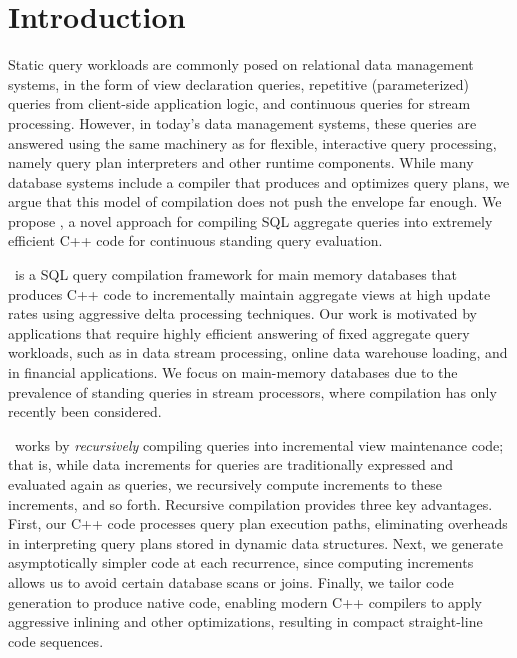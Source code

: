 \section{Introduction}
Static query workloads are commonly posed on relational data management systems,
in the form of view declaration queries, repetitive (parameterized) queries from
client-side application logic, and continuous queries for stream processing.
However, in today's data management systems, these queries are answered using the
same machinery as for flexible, interactive query processing, namely query plan
interpreters and other runtime components. While many database systems include a
compiler that produces and optimizes query plans, we argue that this model of
compilation does not push the envelope far enough. We propose \compiler, a novel
approach for compiling SQL aggregate queries into extremely efficient C++ code
for continuous standing query evaluation.

\compiler\ is a SQL query compilation framework for main memory databases that
produces C++ code to incrementally maintain aggregate views at high update rates
using aggressive delta processing techniques. Our work is motivated by
applications that require highly efficient answering of fixed aggregate query
workloads, such as in data stream processing, online data warehouse loading, and
in financial applications. We focus on main-memory databases due to the
prevalence of standing queries in stream processors, where compilation has
only recently been considered.

\compiler\ works by {\em recursively}\/ compiling queries into incremental view
maintenance code; that is, while data increments for queries are traditionally
expressed and evaluated again as queries, we recursively compute increments to
these increments, and so forth. Recursive compilation provides three key
advantages. First, our C++ code processes query plan execution paths, eliminating
overheads in interpreting query plans stored in dynamic data structures. Next, we
generate asymptotically simpler code at each recurrence, since computing
increments allows us to avoid certain database scans or joins. Finally, we tailor
code generation to produce native code, enabling modern C++ compilers to apply
aggressive inlining and other optimizations, resulting in compact straight-line
code sequences.


